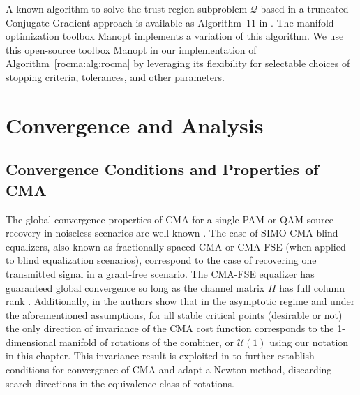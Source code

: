 A known algorithm to solve the trust-region subproblem $\mathcal{Q}$ based in a truncated Conjugate Gradient approach is available as Algorithm~11 in \cite[Section 7.3]{Absil2008book}. 
The manifold optimization toolbox Manopt \cite{manopt} implements a variation of this algorithm. We use this open-source toolbox Manopt in our implementation of Algorithm~\ref{rocma:alg:rocma} by leveraging its flexibility for selectable choices of stopping criteria, tolerances, and other parameters.

\section{Convergence and Analysis} \label{rocma:Performance}

\subsection{Convergence Conditions and Properties of CMA} \label{rocma:subs:known_convergence}
The global convergence properties of CMA for a
single PAM or QAM source recovery in 
noiseless scenarios are well known \cite[Chapters 4-7]{Ding2000}. 
The case of SIMO-CMA blind equalizers, also known as fractionally-spaced CMA or CMA-FSE (when applied to blind equalization scenarios), correspond to the case of recovering one transmitted signal in a grant-free scenario. 
The CMA-FSE equalizer has guaranteed global convergence so long
as the channel matrix $H$ has full column rank \cite{LiDing1994cmaglobalconvergencefse}. Additionally, in \cite{Ding1991} the authors show that in the asymptotic regime and under the aforementioned assumptions, for all stable critical points (desirable or not) the only direction of invariance of the CMA cost function corresponds to the 1-dimensional 
manifold of rotations of the combiner, or $\mathcal{U}(1)$ using our notation in this
chapter. This invariance result is exploited in \cite{Kreutz2008trustregionscma} to further establish conditions for convergence of CMA and adapt a Newton method, discarding search directions in the equivalence class of rotations. 

